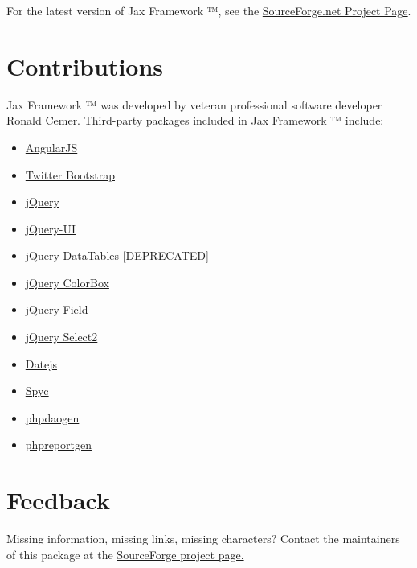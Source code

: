 \documentclass[letterpaper,10pt,english]{sphinxmanual}
\begin{document}
For the latest version of Jax Framework ™, see the \href{http://jaxframework.sourceforge.net/}{SourceForge.net Project Page}.


\section{Contributions}
\label{jaxFrameworkGuide:contributions}
Jax Framework ™ was developed by veteran professional software developer Ronald Cemer.
Third-party packages included in Jax Framework ™ include:
\begin{itemize}
\item {} 
\href{https://angularjs.org/}{AngularJS}

\item {} 
\href{http://twitter.github.com/bootstrap/}{Twitter Bootstrap}

\item {} 
\href{http://jquery.com/}{jQuery}

\item {} 
\href{http://jqueryui.com/}{jQuery-UI}

\item {} 
\href{http://datatables.net/}{jQuery DataTables} {[}DEPRECATED{]}

\item {} 
\href{http://www.jacklmoore.com/colorbox/}{jQuery ColorBox}

\item {} 
\href{http://www.pengoworks.com/workshop/jquery/field/field.plugin.htm}{jQuery Field}

\item {} 
\href{http://ivaynberg.github.com/select2/}{jQuery Select2}

\item {} 
\href{http://www.datejs.com/}{Datejs}

\item {} 
\href{https://code.google.com/p/spyc/}{Spyc}

\item {} 
\href{http://phpdaogen.sourceforge.net/}{phpdaogen}

\item {} 
\href{http://phpreportgen.sourceforge.net/}{phpreportgen}

\end{itemize}


\section{Feedback}
\label{jaxFrameworkGuide:feedback}
Missing information, missing links, missing characters?  Contact the maintainers of this package at
the \href{http://jaxframework.sourceforge.net/}{SourceForge project page.}
\end{document}
